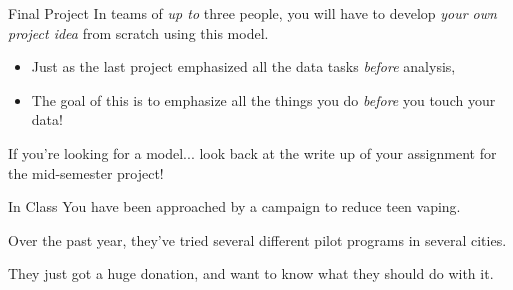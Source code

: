 \documentclass[11pt]{beamer}
\begin{document}
\begin{frame}[c]{Final Project}
  In teams of \emph{up to} three people, \pause you will have to develop \emph{your own project idea} from scratch using this model.
  \begin{itemize}
    \item Just as the last project emphasized all the data tasks \emph{before} analysis,
    \pause \item The goal of this is to emphasize all the things you do \emph{before} you touch your data!
  \end{itemize}
  \vspace*{0.1cm}
  If you're looking for a model... look back at the write up of your assignment for the mid-semester project!
\end{frame}

\begin{frame}[c]{In Class}
You have been approached by a campaign to reduce teen vaping.

Over the past year, they've tried several different pilot programs in several cities.

They just got a huge donation, and want to know what they should do with it.
\end{frame}
\end{document}
